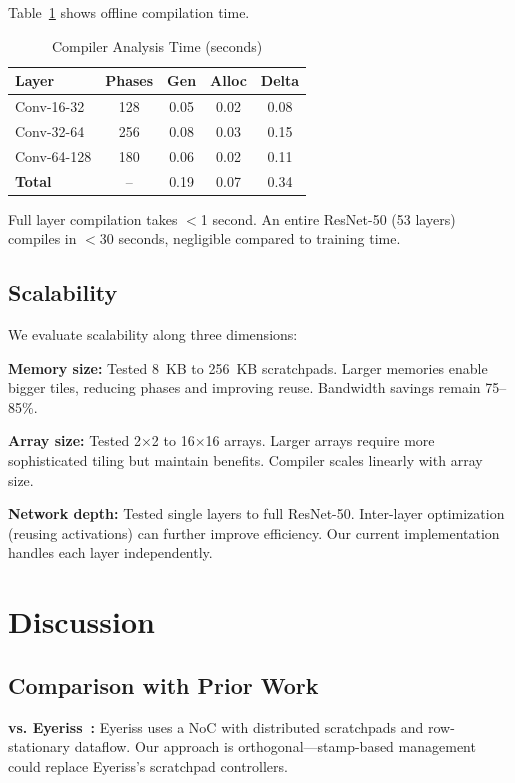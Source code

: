 \documentclass[conference]{IEEEtran}
\begin{document}
Table~\ref{tab:compile} shows offline compilation time.

\begin{table}[t]
\centering
\caption{Compiler Analysis Time (seconds)}
\label{tab:compile}
\begin{tabular}{lcccc}
\toprule
\textbf{Layer} & \textbf{Phases} & \textbf{Gen} & \textbf{Alloc} & \textbf{Delta} \\
\midrule
Conv-16-32 & 128 & 0.05 & 0.02 & 0.08 \\
Conv-32-64 & 256 & 0.08 & 0.03 & 0.15 \\
Conv-64-128 & 180 & 0.06 & 0.02 & 0.11 \\
\midrule
\textbf{Total} & -- & 0.19 & 0.07 & 0.34 \\
\bottomrule
\end{tabular}
\end{table}

Full layer compilation takes $<$1 second. An entire ResNet-50 (53 layers) compiles in $<$30 seconds, negligible compared to training time.

\subsection{Scalability}

We evaluate scalability along three dimensions:

\textbf{Memory size:} Tested 8~KB to 256~KB scratchpads. Larger memories enable bigger tiles, reducing phases and improving reuse. Bandwidth savings remain 75--85\%.

\textbf{Array size:} Tested 2$\times$2 to 16$\times$16 arrays. Larger arrays require more sophisticated tiling but maintain benefits. Compiler scales linearly with array size.

\textbf{Network depth:} Tested single layers to full ResNet-50. Inter-layer optimization (reusing activations) can further improve efficiency. Our current implementation handles each layer independently.

\section{Discussion}

\subsection{Comparison with Prior Work}

\textbf{vs. Eyeriss~\cite{chen2016eyeriss}:} Eyeriss uses a NoC with distributed scratchpads and row-stationary dataflow. Our approach is orthogonal—stamp-based management could replace Eyeriss's scratchpad controllers.
\end{document}
